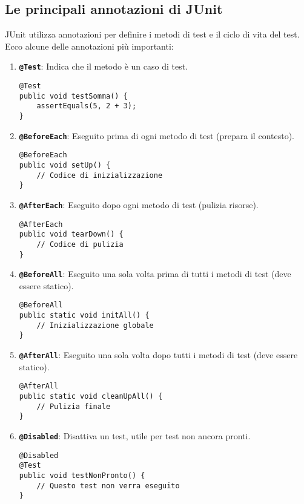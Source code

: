 \documentclass{article}
\begin{document}
\subsection{Le principali annotazioni di JUnit}
JUnit utilizza annotazioni per definire i metodi di test e il ciclo di vita del test. Ecco alcune delle annotazioni più importanti:

\begin{enumerate}
    \item \textbf{\texttt{@Test}}: Indica che il metodo è un caso di test.
    \begin{lstlisting}
@Test
public void testSomma() {
    assertEquals(5, 2 + 3);
}
    \end{lstlisting}

    \item \textbf{\texttt{@BeforeEach}}: Eseguito prima di ogni metodo di test (prepara il contesto).
    \begin{lstlisting}
@BeforeEach
public void setUp() {
    // Codice di inizializzazione
}
    \end{lstlisting}

    \item \textbf{\texttt{@AfterEach}}: Eseguito dopo ogni metodo di test (pulizia risorse).
    \begin{lstlisting}
@AfterEach
public void tearDown() {
    // Codice di pulizia
}
    \end{lstlisting}

    \item \textbf{\texttt{@BeforeAll}}: Eseguito una sola volta prima di tutti i metodi di test (deve essere statico).
    \begin{lstlisting}
@BeforeAll
public static void initAll() {
    // Inizializzazione globale
}
    \end{lstlisting}

    \item \textbf{\texttt{@AfterAll}}: Eseguito una sola volta dopo tutti i metodi di test (deve essere statico).
    \begin{lstlisting}
@AfterAll
public static void cleanUpAll() {
    // Pulizia finale
}
    \end{lstlisting}

    \item \textbf{\texttt{@Disabled}}: Disattiva un test, utile per test non ancora pronti.
    \begin{lstlisting}
@Disabled
@Test
public void testNonPronto() {
    // Questo test non verra eseguito 
}
    \end{lstlisting}
\end{enumerate}
\end{document}
